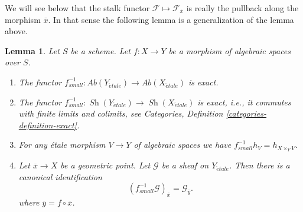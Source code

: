 \documentclass{stacks-project}
\theoremstyle{plain}
\newtheorem{lemma}[subsection]{Lemma}
\theoremstyle{definition}
\theoremstyle{remark}
\numberwithin{equation}{subsection}
\def\Sh{\mathop{\mathit{Sh}}\nolimits}
\def\etale{{\acute{e}tale}}
\begin{document}
\noindent
We will see below that the stalk functor
$\mathcal{F} \mapsto \mathcal{F}_{\overline{x}}$
is really the pullback along the morphism $\overline{x}$. In that sense
the following lemma is a generalization of the lemma above.

\begin{lemma}
\label{lemma-stalk-pullback}
Let $S$ be a scheme.
Let $f : X \to Y$ be a morphism of algebraic spaces over $S$.
\begin{enumerate}
\item The functor
$f_{small}^{-1} :
\textit{Ab}(Y_\etale)
\to
\textit{Ab}(X_\etale)$
is exact.
\item The functor
$f_{small}^{-1} :
\Sh(Y_\etale)
\to
\Sh(X_\etale)$
is exact, i.e., it commutes with finite limits and colimits, see
Categories, Definition \ref{categories-definition-exact}.
\item For any \'etale morphism $V \to Y$ of algebraic spaces
we have $f_{small}^{-1}h_V = h_{X \times_Y V}$.
\item Let $\overline{x} \to X$ be a geometric point.
Let $\mathcal{G}$ be a sheaf on $Y_\etale$.
Then there is a canonical identification
$$
(f_{small}^{-1}\mathcal{G})_{\overline{x}} = \mathcal{G}_{\overline{y}}.
$$
where $\overline{y} = f \circ \overline{x}$.
\end{enumerate}
\end{lemma}
\end{document}
